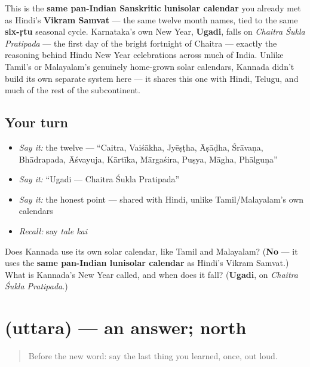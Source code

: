 \begin{culture}
This is the \textbf{same pan-Indian Sanskritic lunisolar calendar} you already met as Hindi's \textbf{Vikram Samvat} — the same twelve month names, tied to the same \textbf{six-ṛtu} seasonal cycle. Karnataka's own New Year, \textbf{Ugadi}, falls on \emph{Chaitra Śukla Pratipada} — the first day of the bright fortnight of Chaitra — exactly the reasoning behind Hindu New Year celebrations across much of India. Unlike Tamil's or Malayalam's genuinely home-grown solar calendars, Kannada didn't build its own separate system here — it shares this one with Hindi, Telugu, and much of the rest of the subcontinent.
\end{culture}

\subsection*{Your turn}
\begin{itemize}
\raggedright
  \item \emph{Say it:} the twelve — \textquotedblleft{}Caitra, Vaiśākha, Jyēṣṭha, Āṣāḍha, Śrāvaṇa, Bhādrapada, Āśvayuja, Kārtīka, Mārgaśira, Puṣya, Māgha, Phālguṇa\textquotedblright{}
  \item \emph{Say it:} \textquotedblleft{}Ugadi — Chaitra Śukla Pratipada\textquotedblright{}
  \item \emph{Say it:} the honest point — shared with Hindi, unlike Tamil/Malayalam's own calendars
  \item \emph{Recall:} say \emph{tale kai}
\end{itemize}

\begin{tcolorbox}[breakable,colback=teal!4,colframe=teal!35!black,title={Before you move on}]
Does Kannada use its own solar calendar, like Tamil and Malayalam? (\textbf{No} — it uses the \textbf{same pan-Indian lunisolar calendar} as Hindi's Vikram Samvat.) What is Kannada's New Year called, and when does it fall? (\textbf{Ugadi}, on \emph{Chaitra Śukla Pratipada}.)
\end{tcolorbox}
\section[\texorpdfstring{\kn{ಉತ್ತರ} (uttara)}{ಉತ್ತರ (uttara)}]{ (uttara) — an answer; north}

\label{lesson:KA-C16-uttara}



\begin{quote}
Before the new word: say the last thing you learned, once, out loud.
\end{quote}

